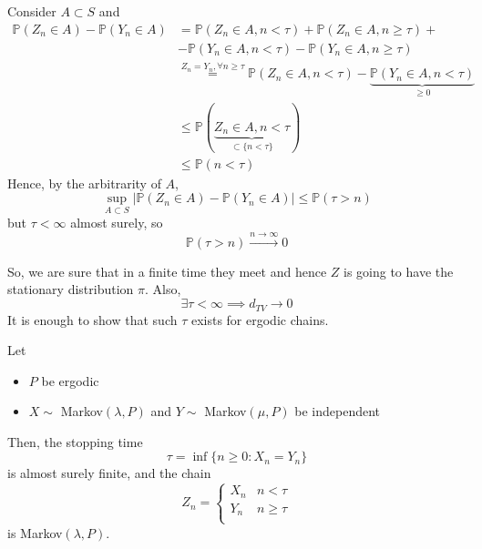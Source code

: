 \documentclass{article}
\begin{document}
        \begin{proof2}
            Consider $A \subset S$ and 
        \begin{align*}
            \mathbb{P}(Z_n \in A) - \mathbb{P}(Y_n \in A) &= \mathbb{P}(Z_n \in A, n < \tau) + \mathbb{P}(Z_n \in A, n \geq \tau) +\\
            &- \mathbb{P}(Y_n \in A, n < \tau) - \mathbb{P}(Y_n \in A, n \geq \tau) \\
            &\stackrel{Z_n = Y_n, \forall n \geq \tau}= \mathbb{P}(Z_n \in A, n < \tau)- \underbrace{\mathbb{P}(Y_n \in A, n < \tau)}_{\geq 0} \\
            &\leq \mathbb{P}(\underbrace{Z_n \in A, n < \tau}_{\subset \{n < \tau\}})\\
            &\leq \mathbb{P}(n < \tau)
        \end{align*}
        Hence, by the arbitrarity of $A$,
        \begin{equation*}
            \sup_{A \subset S} |\mathbb{P}(Z_n \in A) - \mathbb{P}(Y_n \in A)| \leq \mathbb{P}(\tau > n)
        \end{equation*}
        but $\tau < \infty$ almost surely, so
        \begin{equation*}
            \mathbb{P}(\tau > n) \xrightarrow{n \rightarrow \infty} 0
        \end{equation*}
        \end{proof2}
So, we are sure that in a finite time they meet and hence $Z$ is going to have the stationary distribution $\pi$. Also, 
\begin{equation*}
    \exists \tau < \infty \implies d_{TV} \rightarrow 0
\end{equation*}
It is enough to show that such $\tau$ exists for ergodic chains. 
\begin{theorem}
     Let 
        \begin{itemize}
            \item $P$ be ergodic 
            \item $X \sim$ Markov$(\lambda, P)$ and $Y \sim $ Markov$(\mu, P)$ be independent 
        \end{itemize}
        Then, the stopping time 
        \begin{equation*}
            \tau = \inf\{n \geq 0: X_n = Y_n\}
        \end{equation*}
        is almost surely finite, and the chain
        \[
        Z_n =   
        \begin{cases}
            X_n & n<\tau \\
            Y_n & n \geq \tau \\
        \end{cases}
        \]
        is Markov$(\lambda, P)$.
\end{theorem}
\end{document}
